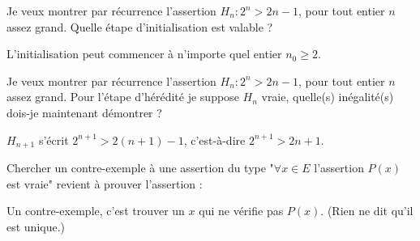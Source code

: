 \begin{question}
\qkeeporder
Je veux montrer par récurrence l'assertion $H_n : 2^n > 2n-1$, pour tout entier $n$ assez grand. Quelle étape d'initialisation est valable ?
\begin{answers}



\end{answers}
\begin{explanations}
L'initialisation peut commencer à n'importe quel entier $n_0 \ge 2$.
\end{explanations}
\end{question}


\begin{question}
Je veux montrer par récurrence l'assertion $H_n : 2^n > 2n-1$, pour tout entier $n$ assez grand. Pour l'étape d'hérédité je suppose $H_n$ vraie, quelle(s) inégalité(s) dois-je maintenant démontrer ?
\begin{answers}
    


\end{answers}
\begin{explanations}
$H_{n+1}$ s'écrit $2^{n+1} > 2(n+1)-1$, c'est-à-dire $2^{n+1} > 2n+1$.
\end{explanations}
\end{question}


\begin{question}
Chercher un contre-exemple à une assertion du type 
"$\forall x \in E$ l'assertion $P(x)$ est vraie" revient à prouver l'assertion :
\begin{answers}

    
    
\end{answers}
\begin{explanations}
Un contre-exemple, c'est trouver un $x$ qui ne vérifie pas $P(x)$. (Rien ne dit qu'il est unique.)
\end{explanations}
\end{question}



